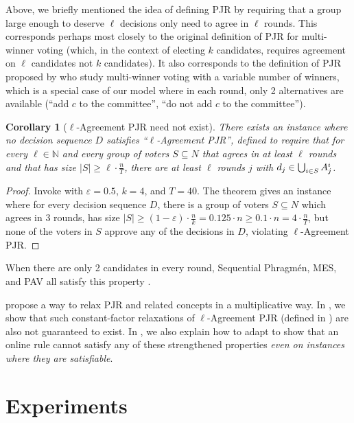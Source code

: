\documentclass[10pt]{scrartcl}
\theoremstyle{plain}
\newtheorem{corollary}[theorem]{Corollary}
\theoremstyle{definition}
\renewcommand*{\ge}{\geqslant}
\renewcommand*{\geq}{\geqslant}
\renewcommand{\epsilon}{\varepsilon}
\begin{document}
Above, we briefly mentioned the idea of defining PJR by requiring that a group large enough to deserve $\ell$ decisions only need to agree in $\ell$ rounds. This corresponds perhaps most closely to the original definition of PJR for multi-winner voting (which, in the context of electing $k$ candidates, requires agreement on $\ell$ candidates not $k$ candidates). It also corresponds to the definition of PJR proposed by \citet{freeman2020proportionality} who study multi-winner voting with a variable number of winners, which is a special case of our model where in each round, only 2 alternatives are available (``add $c$ to the committee'', ``do not add $c$ to the committee''). 

\begin{corollary}[$\ell$-Agreement PJR  need not exist]
	\label{cor:multi-winner-pjr}
	There exists an instance where no decision sequence $D$ satisfies ``\emph{$\ell$-Agreement PJR}'', defined to require that for every $\ell \in \mathbb N$ and every group of voters $S \subseteq N$ that agrees in at least $\ell$ rounds and that has size $|S| \geq \ell\cdot \frac{n}{T}$, there are at least $\ell$ rounds $j$ with $d_j \in \bigcup_{i \in S} \smash{A_j^i}$.
\end{corollary}
\begin{proof}
	 Invoke  with $\epsilon=0.5$, $k = 4$, and $T=40$. The theorem gives an instance where for every decision sequence $D$, there is a group of voters $S \subseteq N$ which agrees in $3$ rounds, has size $|S| \ge (1-\epsilon)\cdot \frac{n}{k} = 0.125\cdot n \ge 0.1\cdot n = 4 \cdot \frac{n}{T}$, but none of the voters in $S$ approve any of the decisions in $D$, violating $\ell$-Agreement PJR.
\end{proof}

When there are only 2 candidates in every round, Sequential Phragm\'en, MES, and PAV all satisfy this property \citep{freeman2020proportionality}.

\citet{DoHL022} propose a way to relax PJR and related concepts in a multiplicative way. In , we show that such constant-factor relaxations of  $\ell$-Agreement PJR (defined in ) are also not guaranteed to exist.
In , we also explain how to adapt  to show that an online rule cannot satisfy any of these strengthened properties \emph{even on instances where they are satisfiable}.
 \section{Experiments}
\label{sec:experiments}
\end{document}
